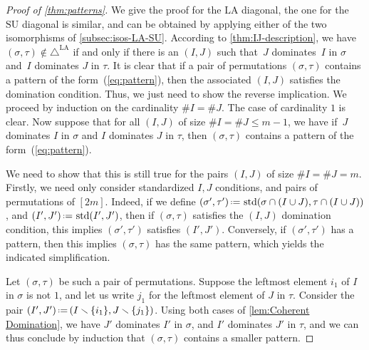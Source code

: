 \documentclass{amsart}
\theoremstyle{definition}
\newcommand{\ssm}{\smallsetminus} %
\newcommand{\eqdef}{\mbox{\,\raisebox{0.2ex}{\scriptsize\ensuremath{\mathrm:}}\ensuremath{=}\,}} %
\newcommand{\card}[1]{\##1} %
\DeclareMathOperator{\std}{std}
\newcommand{\SU}{\mathrm{SU}}
\newcommand{\LA}{\mathrm{LA}}
\newcommand{\LAD}{\triangle^{\mathrm{LA}}}
\begin{document}
\begin{proof}[Proof of \cref{thm:patterns}]
We give the proof for the $\LA$ diagonal, the one for the $\SU$ diagonal is similar, and can be obtained by applying either of the two isomorphisms of \cref{subsec:isos-LA-SU}.
According to \cref{thm:IJ-description}, we have $(\sigma,\tau) \notin \LAD$ if and only if there is an $(I,J)$ such that~$J$ dominates~$I$ in $\sigma$ and~$I$ dominates $J$ in $\tau$.
It is clear that if a pair of permutations $(\sigma,\tau)$ contains a pattern of the form~(\ref{eq:pattern}), then the associated $(I,J)$ satisfies the domination condition.
Thus, we just need to show the reverse implication. 
We proceed by induction on the cardinality $\card{I} = \card{J}$. 
The case of cardinality $1$ is clear. 
Now suppose that for all $(I,J)$ of size $\card{I} = \card{J} \le m-1$, we have if~$J$ dominates $I$ in $\sigma$ and $I$ dominates $J$ in $\tau$, then $(\sigma,\tau)$ contains a pattern of the form~(\ref{eq:pattern}).

We need to show that this is still true for the pairs $(I,J)$ of size $\card{I} = \card{J} = m$.
Firstly, we need only consider standardized $I,J$ conditions, and pairs of permutations of $[2m]$.
Indeed, if we define $(\sigma',\tau') \eqdef \std(\sigma \cap (I\cup J),\tau \cap (I\cup J))$, and $(I',J')\eqdef\std(I',J')$, 
then if $(\sigma,\tau)$ satisfies the $(I,J)$ domination condition, this implies $(\sigma',\tau')$ satisfies $(I',J')$.
Conversely, if $(\sigma',\tau')$ has a pattern, then this implies $(\sigma,\tau)$ has the same pattern, which yields the indicated simplification.

Let $(\sigma,\tau)$ be such a pair of permutations.
Suppose the leftmost element $i_1$ of $I$ in $\sigma$ is not $1$, and let us write $j_1$ for the leftmost element of $J$ in $\tau$.
Consider the pair ${(I',J') \eqdef (I\ssm \{i_1\}, J \ssm \{j_1\})}$.
Using both cases of \cref{lem:Coherent Domination}, we have $J'$ dominates $I'$ in $\sigma$, and $I'$ dominates $J'$ in $\tau$, and we can thus conclude by induction that $(\sigma,\tau)$ contains a smaller pattern.


\end{proof}
\end{document}

